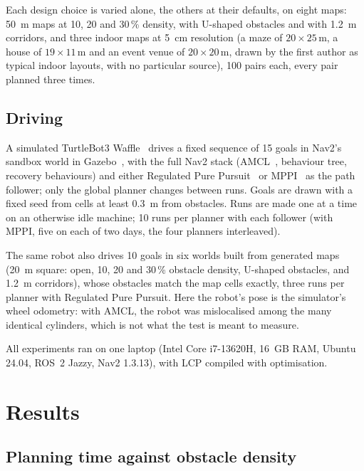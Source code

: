 \documentclass[conference]{IEEEtran}
\newcommand{\lcp}{LCP}
\begin{document}
Each design choice is varied alone, the others at their defaults, on eight maps:
\SI{50}{m} maps at 10, 20 and 30\,\% density, with U-shaped obstacles and with
\SI{1.2}{m} corridors, and three indoor maps at \SI{5}{cm} resolution (a maze of
$20\times25$\,m, a house of $19\times11$\,m and an event venue of $20\times20$\,m,
drawn by the first author as typical indoor layouts, with no particular source), 100 pairs each, every pair planned three
times.

\subsection{Driving}

A simulated TurtleBot3 Waffle~\cite{turtlebot3} drives a fixed sequence of 15
goals in Nav2's sandbox world in Gazebo~\cite{koenig2004gazebo}, with the full
Nav2 stack (AMCL~\cite{dellaert1999mcl,fox2003kld}, behaviour tree, recovery behaviours) and
either Regulated Pure Pursuit~\cite{macenski2023rpp} or
MPPI~\cite{williams2017mppi} as the path follower; only the global planner
changes between runs. Goals are drawn with a fixed seed from
cells at least \SI{0.3}{m} from obstacles. Runs are made one at a time on an
otherwise idle machine; 10 runs per planner with each follower (with MPPI, five
on each of two days, the four planners interleaved).

The same robot also drives 10 goals in six worlds built from generated maps
(\SI{20}{m} square: open, 10, 20 and 30\,\% obstacle density, U-shaped
obstacles, and \SI{1.2}{m} corridors), whose obstacles match the map cells
exactly, three runs per planner with Regulated Pure Pursuit. Here the robot's
pose is the simulator's wheel odometry: with AMCL, the robot was mislocalised
among the many identical cylinders, which is not what the test is meant to
measure.

All experiments ran on one laptop (Intel Core i7-13620H, \SI{16}{GB} RAM, Ubuntu
24.04, ROS~2 Jazzy, Nav2 1.3.13), with \lcp{} compiled with optimisation.

\section{Results}
\label{sec:results}

\subsection{Planning time against obstacle density}
\end{document}
